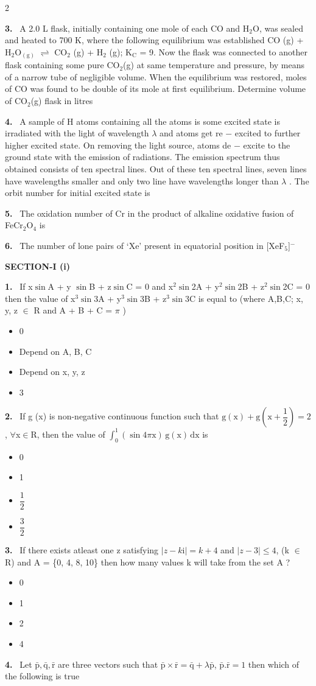 \documentclass[10pt]{extarticle}
\newcommand{\papersec}[1]{\par\bigskip{\centering\Large\bfseries PAPER-#1\par}\medskip}
\newcommand{\partsec}[2]{\par\medskip\noindent{\large\bfseries PART-#1: #2}\par\smallskip}
\newcommand{\sect}[1]{\par\smallskip\noindent\textbf{#1}\par}
\newcommand{\qn}[1]{\par\smallskip\noindent\textbf{#1.}~}
\newenvironment{qoptions}{\begin{itemize}[leftmargin=1.8em,itemsep=1pt,topsep=2pt,label={}]}{\end{itemize}}
\newcommand{\opt}[2]{\item[(#1)] #2}
\begin{document}
\begin{multicols}{2}
\qn{3} A 2.0 L flask, initially containing one mole of each CO and H$_2$O, was sealed and heated to 700 K, where the following equilibrium was established CO (g) + H$_2$O$_{(\mathrm g)}$ $\rightleftharpoons$ CO$_2$ (g) + H$_2$ (g); K$_\mathrm C$ = 9. Now the flask was connected to another flask containing some pure CO$_2$(g) at same temperature and pressure, by means of a narrow tube of negligible volume. When the equilibrium was restored, moles of CO was found to be double of its mole at first equilibrium. Determine volume of CO$_2$(g) flask in litres
\qn{4} A sample of H atoms containing all the atoms is some excited state is irradiated with the light of wavelength $\lambda$ and atoms get re $-$ excited to further higher excited state. On removing the light source, atoms de $-$ excite to the ground state with the emission of radiations. The emission spectrum thus obtained consists of ten spectral lines. Out of these ten spectral lines, seven lines have wavelengths smaller and only two line have wavelengths longer than $\lambda$ . The orbit number for initial excited state is
\qn{5} The oxidation number of Cr in the product of alkaline oxidative fusion of FeCr$_2$O$_4$ is
\qn{6} The number of lone pairs of `Xe' present in equatorial position in [XeF$_5$]$^-$
\raggedcolumns
\papersec{1}
\partsec{3}{MATHEMATICS}
\sect{SECTION-I (i)}
\qn{1} If x$\sin$A + y $\sin$B + z$\sin$C = 0 and x$^2\sin$2A + y$^2\sin$2B + z$^2\sin$2C = 0 then the value of x$^3\sin$3A + y$^3\sin$3B + z$^3\sin$3C is equal to (where A,B,C; x, y, z $\in$ R and A + B + C = $\pi$ )
\begin{qoptions}
\opt{A}{0}
\opt{B}{Depend on A, B, C}
\opt{C}{Depend on x, y, z}
\opt{D}{3}
\end{qoptions}
\qn{2} If g (x) is non-negative continuous function such that $\mathrm g(\mathrm x)+\mathrm g\left(\mathrm x+\dfrac12\right)=2$, $\forall$x$\in$R, then the value of $\displaystyle\int_0^1(\sin4\pi\mathrm x)\,\mathrm g(\mathrm x)\,\mathrm{dx}$ is
\begin{qoptions}
\opt{A}{0}
\opt{B}{1}
\opt{C}{$\dfrac12$}
\opt{D}{$\dfrac32$}
\end{qoptions}
\qn{3} If there exists atleast one z satisfying $|z-k\mathrm i|=k+4$ and $|z-3|\le4$, (k $\in$ R) and A = \{0, 4, 8, 10\} then how many values k will take from the set A ?
\begin{qoptions}
\opt{A}{0}
\opt{B}{1}
\opt{C}{2}
\opt{D}{4}
\end{qoptions}
\qn{4} Let $\bar{\mathrm p},\bar{\mathrm q},\bar{\mathrm r}$ are three vectors such that $\bar{\mathrm p}\times\bar{\mathrm r}=\bar{\mathrm q}+\lambda\bar{\mathrm p}$, $\bar{\mathrm p}.\bar{\mathrm r}=1$ then which of the following is true

\end{multicols}
\end{document}
